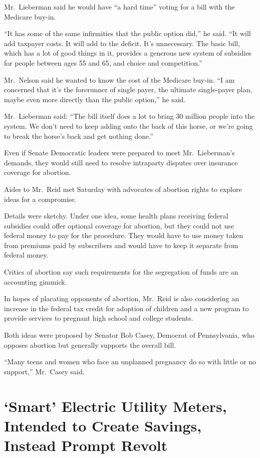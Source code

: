 ﻿\documentclass[12pt]{article}
\begin{document}
Mr.~Lieberman said he would have ``a hard time'' voting for a bill with the Medicare buy-in.

``It has some of the same infirmities that the public option did,'' he said. ``It will add taxpayer
costs. It will add to the deficit. It's unnecessary. The basic bill, which has a lot of good things
in it, provides a generous new system of subsidies for people between ages 55 and 65, and choice and
competition.''

Mr.~Nelson said he wanted to know the cost of the Medicare buy-in. ``I am concerned that it's the
forerunner of single payer, the ultimate single-payer plan, maybe even more directly than the public
option,'' he said.

Mr.~Lieberman said: ``The bill itself does a lot to bring 30 million people into the system. We
don't need to keep adding onto the back of this horse, or we're going to break the horse's back and
get nothing done.''

Even if Senate Democratic leaders were prepared to meet Mr.~Lieberman's demands, they would still
need to resolve intraparty disputes over insurance coverage for abortion.

Aides to Mr.~Reid met Saturday with advocates of abortion rights to explore ideas for a compromise.

Details were sketchy. Under one idea, some health plans receiving federal subsidies could offer
optional coverage for abortion, but they could not use federal money to pay for the procedure. They
would have to use money taken from premiums paid by subscribers and would have to keep it separate
from federal money.

Critics of abortion say such requirements for the segregation of funds are an accounting gimmick.

In hopes of placating opponents of abortion, Mr.~Reid is also considering an increase in the federal
tax credit for adoption of children and a new program to provide services to pregnant high school
and college students.

Both ideas were proposed by Senator Bob Casey, Democrat of Pennsylvania, who opposes abortion but
generally supports the overall bill.

``Many teens and women who face an unplanned pregnancy do so with little or no support,'' Mr.~Casey
said.

\section{`Smart' Electric Utility Meters, Intended to Create Savings, Instead Prompt Revolt}
\end{document}
